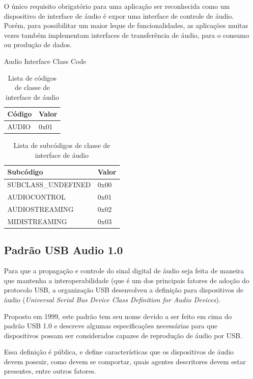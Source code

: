 O único requisito obrigatório para uma aplicação ser reconhecida como um dispositivo de interface de áudio é expor uma interface de controle de áudio. Porém, para possibilitar um maior leque de funcionalidades, as aplicações muitas vezes também implementam interfaces de transferência de áudio, para o consumo ou produção de dados.

Audio Interface Class Code

\begin{table}[h]
\begin{tabular}{|l|l|}
\hline
Código & Valor \\ \hline
AUDIO  & 0x01  \\ \hline
\end{tabular}
\caption{Lista de códigos de classe de interface de áudio}
\label{tab:codigos-interface-audio}
\end{table}

\begin{table}[h]
\begin{tabular}{|l|l|}
\hline
Subcódigo           & Valor \\ \hline
SUBCLASS\_UNDEFINED & 0x00  \\ \hline
AUDIOCONTROL        & 0x01  \\ \hline
AUDIOSTREAMING      & 0x02  \\ \hline
MIDISTREAMING       & 0x03  \\ \hline
\end{tabular}
\caption{Lista de subcódigos de classe de interface de áudio}
\label{tab:subcodigos-interface-audio}
\end{table}
\subsection{Padrão USB Audio 1.0}


Para que a propagação e controle do sinal digital de áudio seja feita de maneira que mantenha a interoperabilidade (que é um dos principais fatores de adoção do protocolo USB, a organização USB desenvolveu a definição para dispositivos de áudio (\textit{Universal Serial Bus Device Class Definition for Audio Devices}).

Proposto em 1999, este padrão tem seu nome devido a ser feito em cima do padrão USB 1.0 e descreve algumas especificações necessárias para que dispositivos possam ser considerados capazes de reprodução de áudio por USB.


Essa definição é pública, e define características que os dispositivos de áudio devem possuir, como devem se comportar, quais agentes descritores devem estar presentes, entre outros fatores. 

